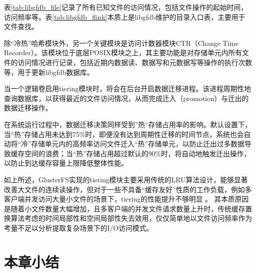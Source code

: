表\ref{tab:libgfdb_file}记录了所有已知文件的访问情况，包括文件操作的起始时间，访问频率等。表\ref{tab:libgfdb_flink}本质上是libgfdb维护的目录入口表，主要用于文件查找。

除“冷热”哈希模块外，另一个关键模块是访问计数器模块CTR（Change Time Recorder）。该模块位于底层POSIX模块之上，其主要功能是对存储单元内所有文件的访问情况进行记录，包括近期内数据读、数据写和元数据写等操作的执行次数等，用于更新libgfdb数据库。

当一个逻辑卷启用tiering模块时，将会在后台开启数据迁移进程。该进程周期性地查询数据库，以获得最近的文件访问情况，从而完成{\color{orange}迁入}（promotion）与{\color{orange}迁出}的数据迁移操作。

在系统运行过程中，数据迁移决策同样受到”热“存储占用率的影响。默认设置下，当“热”存储占用未达到75\%时，即便没有达到周期性迁移的时间节点，系统也会自动将“冷”存储单元内的高频率访问文件迁入“热”存储单元，以防止迁出过多数据导致缓存空间的浪费；当“热”存储占用超过默认的90\%时，将自动地触发迁出操作，以防止到达缓存容量上限降低整体性能。

如上所述，GlusterFS实现的tiering模块主要采用传统的LRU算法设计，能够显著改善大文件的连续读操作，但对于一些不具备“缓存友好”性质的工作负载，例如多客户端并发访问大量小文件的场景下，tiering的性能提升不够明显
\cite{Red_Hat_Gluster_storage_on_supermicro_storage_servers_powered_by_Intel_Xeon_processors}。
其本质原因是随着小文件数量大幅增加，且多客户端的并发文件请求数量上升时，传统缓存置换算法考虑的时间局部性和空间局部性失去效用，仅仅简单地以文件访问频率作为考量不足以分析提取复杂场景下的I/O访问模式。



\section{本章小结}